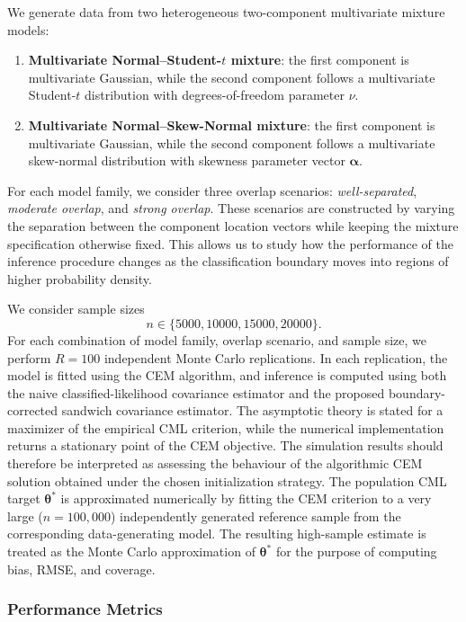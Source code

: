 \documentclass[pdflatex,sn-mathphys-ay]{sn-jnl}%
\let\oldtheta\theta
\renewcommand{\theta}{\boldsymbol{\oldtheta}}
\let\oldalpha\alpha
\renewcommand{\alpha}{\boldsymbol{\oldalpha}}
\theoremstyle{thmstyleone}%
\theoremstyle{thmstyletwo}%
\theoremstyle{thmstylethree}%
\begin{document}
We generate data from two heterogeneous two-component multivariate mixture models:
\begin{enumerate}
    \item \textbf{Multivariate Normal--Student-$t$ mixture}: the first component is multivariate Gaussian, while the second component follows a multivariate Student-$t$ distribution with degrees-of-freedom parameter $\nu$.
    \item \textbf{Multivariate Normal--Skew-Normal mixture}: the first component is multivariate Gaussian, while the second component follows a multivariate skew-normal distribution with skewness parameter vector $\boldsymbol{\alpha}$.
\end{enumerate}

For each model family, we consider three overlap scenarios: \textit{well-separated}, \textit{moderate overlap}, and \textit{strong overlap}. These scenarios are constructed by varying the separation between the component location vectors while keeping the mixture specification otherwise fixed. This allows us to study how the performance of the inference procedure changes as the classification boundary moves into regions of higher probability density.

We consider sample sizes
\[
    n
    \in
    \{5000,10000,15000,20000\}.
\]
For each combination of model family, overlap scenario, and sample size, we perform $R=100$ independent Monte Carlo replications. In each replication, the model is fitted using the CEM algorithm, and inference is computed using both the naive classified-likelihood covariance estimator and the proposed boundary-corrected sandwich covariance estimator. The asymptotic theory is stated for a maximizer of the empirical CML criterion, while the numerical implementation returns a stationary point of the CEM objective. The simulation results should therefore be interpreted as assessing the behaviour of the algorithmic CEM solution obtained under the chosen initialization strategy. The population CML target $\boldsymbol{\theta}^*$ is approximated numerically by fitting the CEM criterion to a very large ($n=100,000$) independently generated reference sample from the corresponding data-generating model. The resulting high-sample estimate is treated as the Monte Carlo approximation of $\boldsymbol{\theta}^*$ for the purpose of computing bias, RMSE, and coverage.

\subsubsection{Performance Metrics}
\end{document}
